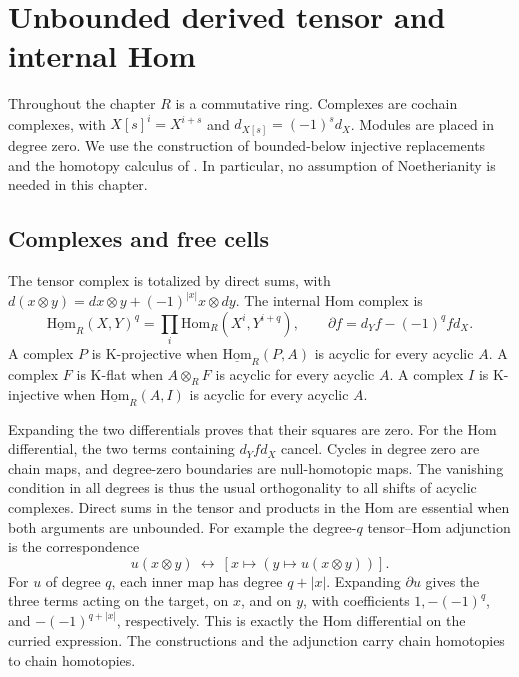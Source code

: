 \chapter{Unbounded derived tensor and internal Hom}
\label{ch:unbounded}

Throughout the chapter \(R\) is a commutative ring. Complexes are
cochain complexes, with \(X[s]^i=X^{i+s}\) and
\(d_{X[s]}=(-1)^s d_X\). Modules are placed in degree zero. We use the
construction of bounded-below injective replacements and the homotopy
calculus of \cite[R01, R03, R04]{ha-core}. In particular, no assumption
of Noetherianity is needed in this chapter.

\section{Complexes and free cells}

\begin{definition}\label{res:U01}
The tensor complex is totalized by direct sums, with
\(d(x\otimes y)=d x\otimes y+(-1)^{|x|}x\otimes d y\).
The internal Hom complex is
\[
 \underline{\mathrm{Hom}}_R(X,Y)^q
   =\prod_i\mathrm{Hom}_R(X^i,Y^{i+q}),\qquad
 \partial f=d_Y f-(-1)^q f d_X .
\]
A complex \(P\) is K-projective when
\(\underline{\mathrm{Hom}}_R(P,A)\) is acyclic for every acyclic \(A\).
A complex \(F\) is K-flat when \(A\otimes_R F\) is acyclic for every
acyclic \(A\). A complex \(I\) is K-injective when
\(\underline{\mathrm{Hom}}_R(A,I)\) is acyclic for every acyclic \(A\).
\end{definition}

Expanding the two differentials proves that their squares are zero.
For the Hom differential, the two terms containing \(d_Y f d_X\)
cancel. Cycles in degree zero are chain maps, and degree-zero
boundaries are null-homotopic maps. The vanishing condition in all
degrees is thus the usual orthogonality to all shifts of acyclic
complexes. Direct sums in the tensor and products in the Hom are
essential when both arguments are unbounded. For example the
degree-\(q\) tensor--Hom adjunction is the correspondence
\[
 u(x\otimes y)\ \longleftrightarrow\ [x\longmapsto(y\longmapsto
 u(x\otimes y))].
\]
For \(u\) of degree \(q\), each inner map has degree \(q+|x|\).
Expanding \(\partial u\) gives the three terms acting on the target,
on \(x\), and on \(y\), with coefficients \(1,-(-1)^q\),
and \(-(-1)^{q+|x|}\), respectively. This is exactly the Hom
differential on the curried expression. The constructions and the
adjunction carry chain homotopies to chain homotopies.

